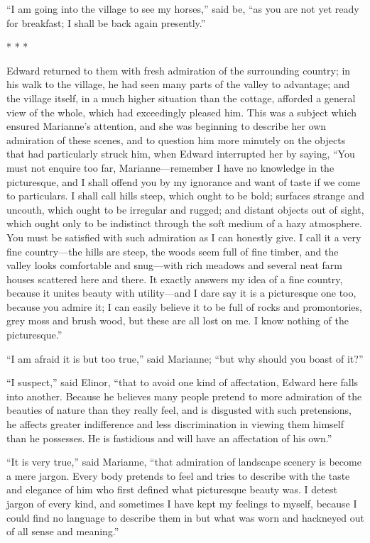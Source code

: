 \documentclass{article}
\begin{document}
``I am going into the village to see my horses,''
said be, ``as you are not yet ready for breakfast; I shall
be back again presently.''

\begin{center}* * *\end{center}

Edward returned to them with fresh admiration
of the surrounding country; in his walk to the village,
he had seen many parts of the valley to advantage;
and the village itself, in a much higher situation than
the cottage, afforded a general view of the whole, which had
exceedingly pleased him.  This was a subject which ensured
Marianne's attention, and she was beginning to describe
her own admiration of these scenes, and to question him more
minutely on the objects that had particularly struck him,
when Edward interrupted her by saying, ``You must not
enquire too far, Marianne---remember I have no knowledge
in the picturesque, and I shall offend you by my ignorance
and want of taste if we come to particulars.  I shall call
hills steep, which ought to be bold; surfaces strange
and uncouth, which ought to be irregular and rugged;
and distant objects out of sight, which ought only to be
indistinct through the soft medium of a hazy atmosphere.
You must be satisfied with such admiration as I can
honestly give.  I call it a very fine country---the
hills are steep, the woods seem full of fine timber,
and the valley looks comfortable and snug---with rich
meadows and several neat farm houses scattered here
and there.  It exactly answers my idea of a fine country,
because it unites beauty with utility---and I dare say it
is a picturesque one too, because you admire it; I can
easily believe it to be full of rocks and promontories,
grey moss and brush wood, but these are all lost on me.
I know nothing of the picturesque.''

``I am afraid it is but too true,'' said Marianne;
``but why should you boast of it?''

``I suspect,'' said Elinor, ``that to avoid one kind
of affectation, Edward here falls into another.  Because he
believes many people pretend to more admiration of the beauties
of nature than they really feel, and is disgusted with
such pretensions, he affects greater indifference and less
discrimination in viewing them himself than he possesses.
He is fastidious and will have an affectation of his own.''

``It is very true,'' said Marianne, ``that admiration
of landscape scenery is become a mere jargon.
Every body pretends to feel and tries to describe with
the taste and elegance of him who first defined what
picturesque beauty was.  I detest jargon of every kind,
and sometimes I have kept my feelings to myself,
because I could find no language to describe them
in but what was worn and hackneyed out of all sense and meaning.''
\end{document}

